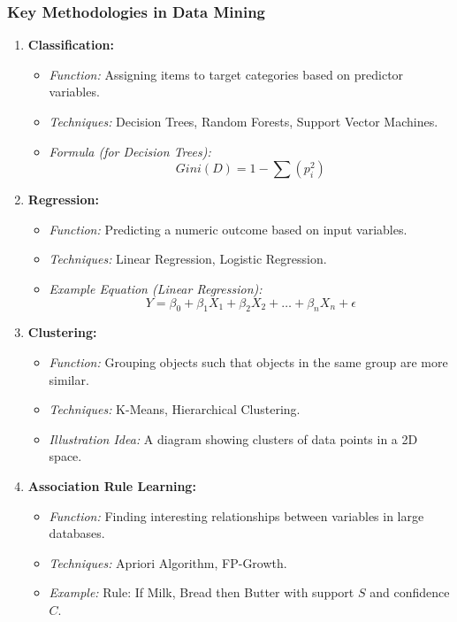 \documentclass[aspectratio=169]{beamer}
\begin{document}
\begin{frame}[fragile]
    \frametitle{Key Methodologies in Data Mining}
    \begin{enumerate}
        \item \textbf{Classification:}
            \begin{itemize}
                \item \textit{Function:} Assigning items to target categories based on predictor variables.
                \item \textit{Techniques:} Decision Trees, Random Forests, Support Vector Machines.
                \item \textit{Formula (for Decision Trees):}
                \begin{equation}
                    Gini(D) = 1 - \sum (p_i^2)
                \end{equation}
            \end{itemize}

        \item \textbf{Regression:}
            \begin{itemize}
                \item \textit{Function:} Predicting a numeric outcome based on input variables.
                \item \textit{Techniques:} Linear Regression, Logistic Regression.
                \item \textit{Example Equation (Linear Regression):}
                \begin{equation}
                    Y = \beta_0 + \beta_1X_1 + \beta_2X_2 + \ldots + \beta_nX_n + \epsilon
                \end{equation}
            \end{itemize}

        \item \textbf{Clustering:}
            \begin{itemize}
                \item \textit{Function:} Grouping objects such that objects in the same group are more similar.
                \item \textit{Techniques:} K-Means, Hierarchical Clustering.
                \item \textit{Illustration Idea:} A diagram showing clusters of data points in a 2D space.
            \end{itemize}

        \item \textbf{Association Rule Learning:}
            \begin{itemize}
                \item \textit{Function:} Finding interesting relationships between variables in large databases.
                \item \textit{Techniques:} Apriori Algorithm, FP-Growth.
                \item \textit{Example:} Rule: If {Milk, Bread} then {Butter} with support \( S \) and confidence \( C \).
            \end{itemize}
    \end{enumerate}
\end{frame}
\end{document}
